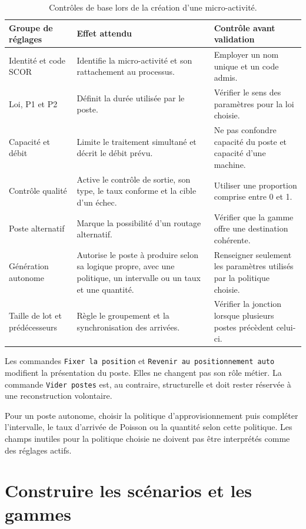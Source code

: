 \begin{table}[H]
  \centering
  \begin{tabularx}{\textwidth}{L{0.25\textwidth} Y Y}
    \toprule
    Groupe de réglages & Effet attendu & Contrôle avant validation \\
    \midrule
    Identité et code SCOR & Identifie la micro-activité et son rattachement au processus. & Employer un nom unique et un code admis. \\
    Loi, P1 et P2 & Définit la durée utilisée par le poste. & Vérifier le sens des paramètres pour la loi choisie. \\
    Capacité et débit & Limite le traitement simultané et décrit le débit prévu. & Ne pas confondre capacité du poste et capacité d'une machine. \\
    Contrôle qualité & Active le contrôle de sortie, son type, le taux conforme et la cible d'un échec. & Utiliser une proportion comprise entre 0 et 1. \\
    Poste alternatif & Marque la possibilité d'un routage alternatif. & Vérifier que la gamme offre une destination cohérente. \\
    Génération autonome & Autorise le poste à produire selon sa logique propre, avec une politique, un intervalle ou un taux et une quantité. & Renseigner seulement les paramètres utilisés par la politique choisie. \\
    Taille de lot et prédécesseurs & Règle le groupement et la synchronisation des arrivées. & Vérifier la jonction lorsque plusieurs postes précèdent celui-ci. \\
    \bottomrule
  \end{tabularx}
  \caption{Contrôles de base lors de la création d'une micro-activité.}
  \label{tab:configuration-poste}
\end{table}

Les commandes \texttt{Fixer la position} et \texttt{Revenir au positionnement auto} modifient la présentation du poste. Elles ne changent pas son rôle métier. La commande \texttt{Vider postes} est, au contraire, structurelle et doit rester réservée à une reconstruction volontaire.

Pour un poste autonome, choisir la politique d'approvisionnement puis compléter l'intervalle, le taux d'arrivée de Poisson ou la quantité selon cette politique. Les champs inutiles pour la politique choisie ne doivent pas être interprétés comme des réglages actifs.

\section{Construire les scénarios et les gammes}

